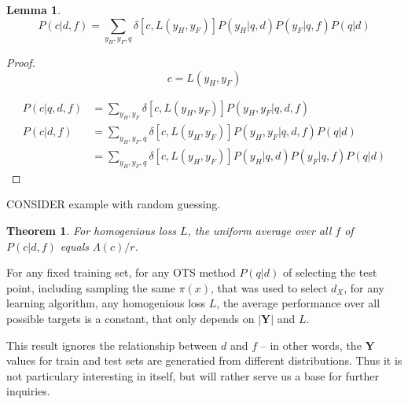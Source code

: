 \documentclass[a4paper]{article}
\newtheorem{theorem}{Theorem}[section]
\newtheorem{lemma}{Lemma}
\begin{document}
\begin{lemma}
\begin{equation}
  P(c|d,f) = \sum_{y_H,y_F,q}\delta\left[c,L\left(y_H, y_F\right)\right] P\left(y_H|q, d\right)
  P\left(y_F| q, f\right)P\left(q|d\right)
\end{equation}
\label{lm:Pcdf}
\end{lemma}

\begin{proof}
\begin{equation}
  c = L\left(y_H, y_F\right)
\end{equation}

\begin{equation}
\begin{split}
  P\left(c|q,d,f\right)& = \sum_{y_H,y_F} \delta\left[c,L\left(y_H,
      y_F\right)\right] P\left(y_H, y_F| q,d,f\right) \\
  P\left(c|d,f\right) & = \sum_{y_H,y_F,q} \delta\left[c,L\left(y_H,
      y_F\right)\right] P\left(y_H, y_F|q, d,f\right) P\left(q|d\right) \\
  & = \sum_{y_H,y_F,q} \delta\left[c,L\left(y_H, y_F\right)\right]
  P\left(y_H|q,d\right) P\left(y_F|q,f\right) P\left(q|d\right)
\end{split}
\end{equation}
\end{proof}
CONSIDER example with random guessing.

\begin{theorem}
  For homogenious loss $L$, the uniform average over all $f$ of
  $P\left(c|d,f\right)$ equals $\Lambda\left(c\right)/r$.
  \label{th:Pcdf}
\end{theorem}

For any fixed training set, for any OTS method $P(q|d)$ of selecting
the test point, including sampling the same $\pi(x)$, that was used to
select $d_X$, for any learning algorithm, any homogenious loss $L$,
the average performance over all possible targets is a constant, that
only depends on $\left|\mathbf{Y}\right|$ and $L$.

This result ignores the relationship between $d$ and $f$ -- in other
words, the $\mathbf{Y}$ values for train and test sets are generatied
from different distributions. Thus it is not particulary interesting
in itself, but will rather serve us a base for further inquiries.
\end{document}
